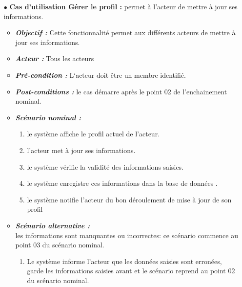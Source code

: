 \begin{itemize}
	
	\item[$\bullet$] \textbf{Cas d’utilisation Gérer le profil :} permet à l’acteur de mettre à jour ses informations.
	\medskip
	\begin{itemize}
		\item \textit{\textbf{Objectif :}}  Cette fonctionnalité permet aux différents acteurs de mettre à jour ses informations. 
		
		\item \textit{\textbf{Acteur :}} Tous les acteurs
		
		\item \textit{\textbf{Pré-condition  :}}  L‘acteur doit être un membre identifié.
		\item \textit{\textbf{Post-conditions   :}} le cas démarre après le point 02 de l’enchainement nominal.
		\item \textit{\textbf{Scénario nominal :}}
		\begin{enumerate}
			\item le système affiche le profil actuel de l’acteur. 
			\item l’acteur met à jour ses informations. 
			\item  le système vérifie la validité des informations saisies.  
			\item  le système enregistre ces informations dans la base de données .  
			\item le système notifie l’acteur du bon déroulement de mise à jour de son profil
		\end{enumerate}
		\item \textit{\textbf{Scénario alternative :}} \\
			les informations sont manquantes ou incorrectes: ce scénario commence au point 03 du
		scénario nominal.
		\begin{enumerate}
		
			\item Le système informe l’acteur que les données saisies sont erronées, garde les informations
			saisies avant et le scénario reprend au point 02 du scénario nominal. 
		\end{enumerate}
	\end{itemize}
\end{itemize}	
	\bigskip













